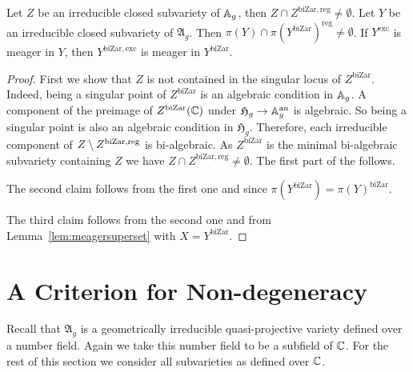 \documentclass[12pt,oneside]{amsart}
\begin{document}


\begin{lemma}
  \label{lem:YcapYbizarreg}
  Let $Z$ be an irreducible closed subvariety of ${\mathbb{A}}_g$, 
  then $Z\cap Z^{\mathrm{biZar,reg}}\not=\emptyset$.
  Let $Y$ be an irreducible closed subvariety of $\mathfrak{A}_g$.
  Then $\pi(Y)\cap
  \pi(Y^{\mathrm{biZar}})^{\mathrm{reg}}\not=\emptyset$.
  If $Y^{\mathrm{exc}}$ is meager in $Y$, then
  $Y^{\mathrm{biZar,exc}}$ is meager in
  $Y^{\mathrm{biZar}}$.
\end{lemma}
\begin{proof}
  First we show that $Z$ is not contained in the singular locus of
  $Z^{\mathrm{biZar}}$.
  Indeed, being a singular point of $Z^{\mathrm{biZar}}$ is an
  algebraic condition in ${\mathbb{A}}_g$. A component of the preimage
  of $Z^{\mathrm{biZar}}({\mathbb{C}})$ under
  $\mathfrak{H}_g\rightarrow {\mathbb{A}}_g^{\mathrm{an}}$ is algebraic. So being a
  singular point is also an algebraic condition in $\mathfrak{H}_g$.
  Therefore, each irreducible component of  $Z\setminus
  Z^{\mathrm{biZar,reg}}$ is bi-algebraic.
  As $Z^{\mathrm{biZar}}$ is the minimal bi-algebraic subvariety
  containing $Z$ we have $Z\cap Z^{\mathrm{biZar,reg}}\not=\emptyset$.
  The first part of the follows.


  The second claim follows from the first one and since $\pi(Y^{\mathrm{biZar}})=
  \pi(Y)^{\mathrm{biZar}}$.

  The third claim follows from the second one and from 
  Lemma~\ref{lem:meagersuperset} with $X = Y^{\mathrm{biZar}}$.
\end{proof}

\section{A Criterion for Non-degeneracy}
\label{sec:critnondeg}
Recall that $\mathfrak{A}_{g}$ is a geometrically irreducible
quasi-projective variety defined over a number field. Again we take
this number field to be a subfield of ${\mathbb{C}}$. For the rest of this
section we
consider all subvarieties as defined over ${\mathbb{C}}$. %
\end{document}

